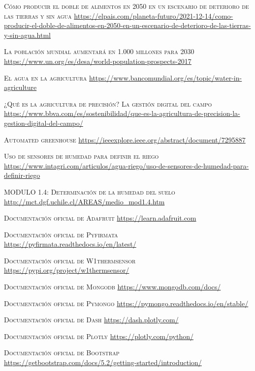 \documentclass[a4paper, 12pt, oneside]{book}
\begin{document}
\begin{thebibliography}{X}
\textsc{Cómo producir el doble de alimentos en 2050 en un escenario de deterioro de las tierras y sin agua}
\url{https://elpais.com/planeta-futuro/2021-12-14/como-producir-el-doble-de-alimentos-en-2050-en-un-escenario-de-deterioro-de-las-tierras-y-sin-agua.html}

\textsc{La población mundial aumentará en 1.000 millones para 2030}
\url{https://www.un.org/es/desa/world-population-prospects-2017}

\textsc{El agua en la agricultura}
\url{https://www.bancomundial.org/es/topic/water-in-agriculture}

\textsc{¿Qué es la agricultura de precisión? La gestión digital del campo}
\url{https://www.bbva.com/es/sostenibilidad/que-es-la-agricultura-de-precision-la-gestion-digital-del-campo/}

\textsc{Automated greenhouse}
\url{https://ieeexplore.ieee.org/abstract/document/7295887}

\textsc{Uso de sensores de humedad para definir el riego}
\url{https://www.intagri.com/articulos/agua-riego/uso-de-sensores-de-humedad-para-definir-riego}

\textsc{ MODULO 1.4: Determinación de la humedad del suelo}
\url{http://mct.dgf.uchile.cl/AREAS/medio_mod1.4.htm}

 \textsc{Documentación oficial de Adafruit}
\url{https://learn.adafruit.com}

 \textsc{Documentación oficial de Pyfirmata}
\url{https://pyfirmata.readthedocs.io/en/latest/}

 \textsc{Documentación oficial de W1thermsensor}
\url{https://pypi.org/project/w1thermsensor/}

 \textsc{Documentación oficial de Mongodb}
\url{https://www.mongodb.com/docs/}

 \textsc{Documentación oficial de Pymongo}
\url{https://pymongo.readthedocs.io/en/stable/}

 \textsc{Documentación oficial de Dash}
\url{https://dash.plotly.com/}

 \textsc{Documentación oficial de Plotly}
\url{https://plotly.com/python/}

 \textsc{Documentación oficial de Bootstrap}
\url{https://getbootstrap.com/docs/5.2/getting-started/introduction/}


\end{thebibliography}
\end{document}
